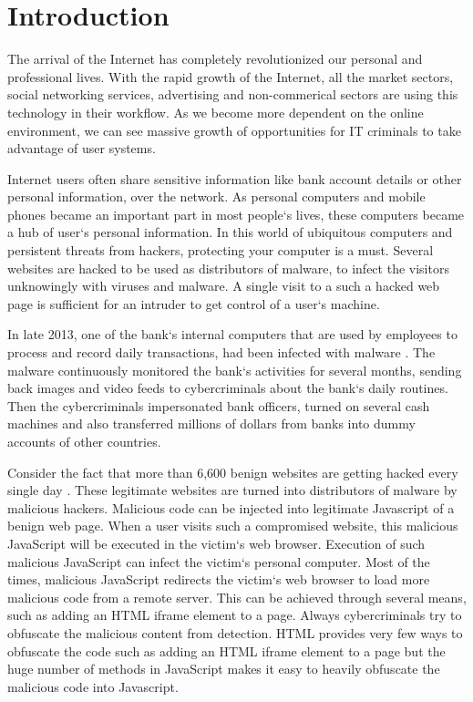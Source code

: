 \chapter{Introduction}

The arrival of the Internet has completely revolutionized our personal and professional lives. With the rapid growth of the Internet, all the market sectors, social networking services, advertising and non-commerical sectors are using this technology in their workflow. As we become more dependent on the online environment, we can see massive growth of opportunities for IT criminals to take advantage of user systems. 

Internet users often share sensitive information like bank account details or other personal information, over the network. As personal computers and mobile phones became an important part in most people`s lives, these computers became a hub of user`s personal information. In this world of ubiquitous computers and persistent threats from hackers, protecting your computer is a must. Several websites are hacked to be used as distributors of malware, to infect the visitors unknowingly with viruses and malware. A single visit to a such a hacked web page is sufficient for an intruder to get control of a user`s machine.

In late 2013, one of the bank`s internal computers that are used by employees to process and record daily transactions, had been infected with malware \cite{bib7}. The malware continuously monitored the bank`s activities for several months, sending back images and video feeds to cybercriminals about the bank`s daily routines. Then the cybercriminals impersonated bank officers, turned on several cash machines and also transferred millions of dollars from banks into dummy accounts of other countries.

Consider the fact that more than 6,600 benign websites are getting hacked every single day \cite{bib6}. These legitimate websites are turned into distributors of malware by malicious hackers. Malicious code can be injected into legitimate Javascript of a benign web page. When a user visits such a compromised website, this malicious JavaScript will be executed in the victim`s web browser. Execution of such malicious JavaScript can infect the victim`s personal computer. Most of the times, malicious JavaScript redirects the victim`s web browser to load more malicious code from a remote server. This can be achieved through several means, such as adding an HTML iframe element to a page. Always cybercriminals try to obfuscate the malicious content from detection. HTML provides very few ways to obfuscate the code such as adding an HTML iframe element to a page but the huge number of methods in JavaScript makes it easy to heavily obfuscate the malicious code into Javascript.

